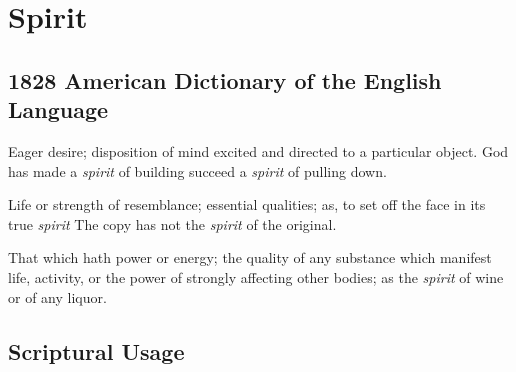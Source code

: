 \section{Spirit}
	\label{SPIRIT}
	

\subsection{1828 American Dictionary of the English Language} %
	\label{SPIRIT-1828}

	\begin{compactitem}
		\item[11] Eager desire; disposition of mind excited and directed to a particular object. God has made a \textit{spirit} of building succeed a \textit{spirit} of pulling down.
		\item[15] Life or strength of resemblance; essential qualities; as, to set off the face in its true \textit{spirit} The copy has not the \textit{spirit} of the original.
		\item[17] That which hath power or energy; the quality of any substance which manifest life, activity, or the power of strongly affecting other bodies; as the \textit{spirit} of wine or of any liquor.
	\end{compactitem}



\subsection{Scriptural Usage} %
	\label{SPIRIT-SCRIPTURES}

